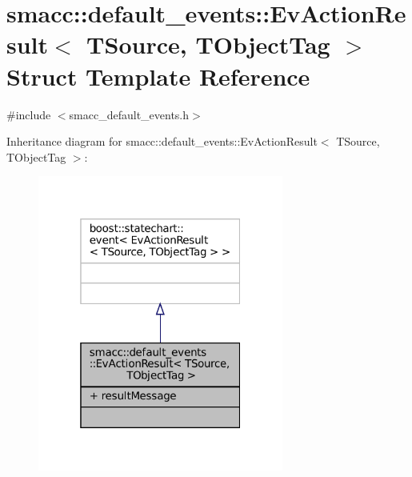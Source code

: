 \hypertarget{structsmacc_1_1default__events_1_1EvActionResult}{}\section{smacc\+:\+:default\+\_\+events\+:\+:Ev\+Action\+Result$<$ T\+Source, T\+Object\+Tag $>$ Struct Template Reference}
\label{structsmacc_1_1default__events_1_1EvActionResult}


{\ttfamily \#include $<$smacc\+\_\+default\+\_\+events.\+h$>$}



Inheritance diagram for smacc\+:\+:default\+\_\+events\+:\+:Ev\+Action\+Result$<$ T\+Source, T\+Object\+Tag $>$\+:
\nopagebreak
\begin{figure}[H]
\begin{center}
\leavevmode
\includegraphics[width=229pt]{structsmacc_1_1default__events_1_1EvActionResult__inherit__graph}
\end{center}
\end{figure}


